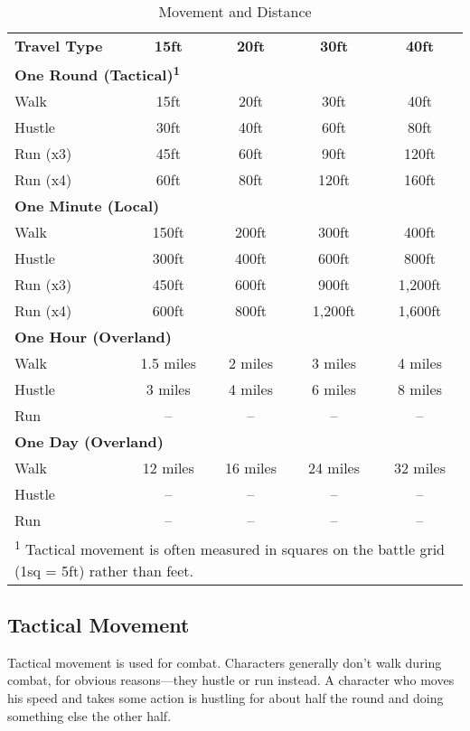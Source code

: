 \begin{table}[htb]
\sffamily
{}\mcinherit
\caption{Movement and Distance}
\centering
\begin{tabular}{l c c c c}
\textbf{Travel Type} & \textbf{15ft} & \textbf{20ft} & \textbf{30ft} & \textbf{40ft}\\
\multicolumn{5}{l}{\textbf{One Round (Tactical)\textsuperscript{1}}}\\
Walk & 15ft & 20ft & 30ft & 40ft\\
Hustle & 30ft & 40ft & 60ft & 80ft\\
Run (x3) & 45ft & 60ft & 90ft & 120ft\\
Run (x4) & 60ft & 80ft & 120ft & 160ft\\
\multicolumn{5}{l}{\textbf{One Minute (Local)}}\\
Walk & 150ft & 200ft & 300ft & 400ft\\
Hustle & 300ft & 400ft & 600ft & 800ft\\
Run (x3) & 450ft & 600ft & 900ft & 1,200ft\\
Run (x4) & 600ft & 800ft & 1,200ft & 1,600ft\\
\multicolumn{5}{l}{\textbf{One Hour (Overland)}}\\
Walk & 1.5 miles & 2 miles & 3 miles & 4 miles\\
Hustle & 3 miles & 4 miles & 6 miles & 8 miles\\
Run & -- & -- & -- & --\\
\multicolumn{5}{l}{\textbf{One Day (Overland)}}\\
Walk & 12 miles & 16 miles & 24 miles & 32 miles\\
Hustle & -- & -- & -- & --\\
Run & -- & -- & -- & --\\
\multicolumn{5}{p{8cm}}{\textsuperscript{1} Tactical movement is often measured in squares on the battle grid (1sq = 5ft) rather than feet.}\\
\end{tabular}
\end{table}

				
\subsection{Tactical Movement}

				
Tactical movement is used for combat. Characters generally don't walk during combat, for obvious reasons---they hustle or run instead. A character who moves his speed and takes some action is hustling for about half the round and doing something else the other half.
				
